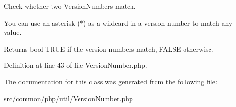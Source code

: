 Check whether two Version\+Numbers match.

You can use an asterisk ($\ast$) as a wildcard in a version number to match any value.

\begin{DoxyReturn}{Returns}
bool T\+R\+UE if the version numbers match, F\+A\+L\+SE otherwise. 
\end{DoxyReturn}


Definition at line 43 of file Version\+Number.\+php.



The documentation for this class was generated from the following file\+:\begin{DoxyCompactItemize}
\item 
src/common/php/util/\hyperlink{VersionNumber_8php}{Version\+Number.\+php}\end{DoxyCompactItemize}

